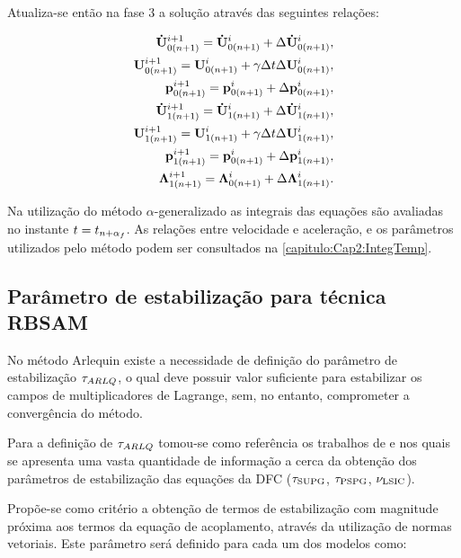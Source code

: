 Atualiza-se então na fase 3 a solução através das seguintes relações:

\begin{align}
	\mathbf{\dot{U}}_{0(n+1)}^{i+1} = \mathbf{\dot{U}}_{0(n+1)}^{i} + \Delta\mathbf{\dot{U}}_{0(n+1)}^{i}, \label{eq:atu_acel_0} \\ 
	\mathbf{U}_{0(n+1)}^{i+1} = \mathbf{U}_{0(n+1)}^{i} + \gamma \Delta t \Delta\mathbf{U}_{0(n+1)}^{i},\label{eq:atu_vel_0}\\
	\mathbf{p}_{0(n+1)}^{i+1} = \mathbf{p}_{0(n+1)}^{i} + \Delta\mathbf{p}_{0(n+1)}^{i}, \label{eq:atu_press_0} \\
	\mathbf{\dot{U}}_{1(n+1)}^{i+1} = \mathbf{\dot{U}}_{1(n+1)}^{i} + \Delta\mathbf{\dot{U}}_{1(n+1)}^{i}, \label{eq:atu_acel_1} \\ 
	\mathbf{U}_{1(n+1)}^{i+1} = \mathbf{U}_{1(n+1)}^{i} + \gamma \Delta t \Delta\mathbf{U}_{1(n+1)}^{i},\label{eq:atu_vel_1}\\
	\mathbf{p}_{1(n+1)}^{i+1} = \mathbf{p}_{0(n+1)}^{i} + \Delta\mathbf{p}_{1(n+1)}^{i}, \label{eq:atu_press_1} \\
	\boldsymbol{\Lambda}_{1(n+1)}^{i+1} = \boldsymbol{\Lambda}_{0(n+1)}^{i} + \Delta\boldsymbol{\Lambda}_{1(n+1)}^{i}. \label{eq:atu_lag_mult}
\end{align}

Na utilização do método $\alpha$-generalizado as integrais das equações são avaliadas no instante $t = t_{n+\alpha_f}$. As relações entre velocidade e aceleração, e os parâmetros utilizados pelo método podem ser consultados na \autoref{capitulo:Cap2:IntegTemp}.

\subsection{Parâmetro de estabilização para técnica RBSAM}

No método Arlequin existe a necessidade de definição do parâmetro de estabilização $\tau_{ARLQ}$, o qual deve possuir valor suficiente para estabilizar os campos de multiplicadores de Lagrange, sem, no entanto, comprometer a convergência do método. 

Para a definição de $\tau_{ARLQ}$ tomou-se como referência os trabalhos de  e  nos quais se apresenta uma vasta quantidade de informação a cerca da obtenção dos parâmetros de estabilização das equações da DFC ($\tau_{\mathrm{SUPG}}$, $\tau_{\mathrm{PSPG}}$, $\nu_{\mathrm{LSIC}}$). 
 
Propõe-se como critério a obtenção de termos de estabilização com magnitude próxima aos termos da equação de acoplamento, através da utilização de normas vetoriais. Este parâmetro será definido para cada um dos modelos como:

